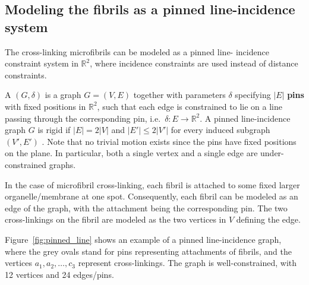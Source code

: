\subsection{Modeling the fibrils as a pinned line-incidence system}



The cross-linking microfibrils can be modeled as a pinned line-
incidence constraint system in $\mathbb{R}^2$, where incidence
constraints are used instead of distance constraints.

A  $(G,\delta)$ is a graph $G=(V,E)$
together with parameters $\delta$ specifying $|E|$ \textbf{pins} with
fixed positions in $\mathbb{R}^2$, such that each edge is constrained
to lie on a line passing through the corresponding pin, i.e.\ $\delta:
E \rightarrow \mathbb{R}^2$.
%
%
A pinned line-incidence graph $G$ is rigid if $|E| = 2|V|$ and $|E'| \le 2|V'|$ for every induced subgraph $(V',E')$ \cite{sitharam2014incidence}. Note that no trivial motion exists since the pins have fixed positions on the plane.
In particular, both a single vertex and a single edge are under-constrained graphs.




In the case of microfibril cross-linking, each fibril is
attached to some fixed larger organelle/membrane at one spot.
Consequently, each fibril can be modeled as an edge of the graph,
with the attachment being the corresponding pin.
The two cross-linkings on the fibril are modeled as the two vertices in $V$ defining the edge.



Figure~\ref{fig:pinned_line} shows an example of a pinned line-incidence graph,
where the grey ovals stand for pins representing attachments of fibrils,
and the vertices $a_1,a_2,\ldots, c_3$ represent cross-linkings.
The graph is well-constrained, with 12 vertices and 24 edges/pins.

